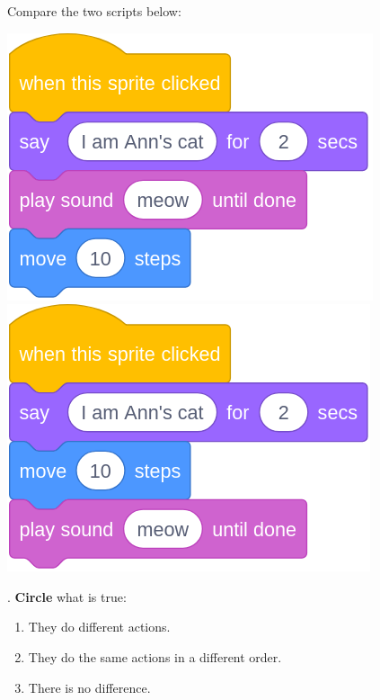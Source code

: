 \documentclass[letterpaper,12pt]{article}
\begin{document}
\noindent Compare the two scripts below:
\begin{center}
\includegraphics[scale=.3,valign=t]{q5_script0.png} \hspace{0.5in}
\includegraphics[scale=.3,valign=t]{q5_script1.png}
\end{center}

. \textbf{Circle} what is true:
\renewcommand{\theenumi}{\Alph{enumi}}
\begin{enumerate}
\item They do different actions. 
\item They do the same actions in a different order.
\item There is no difference.
\end{enumerate}
\noindent \dotfill \\

\newpage
\end{document}
